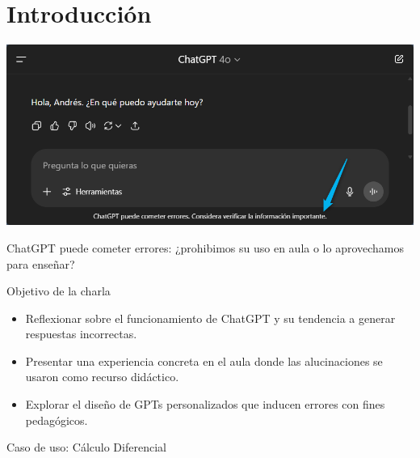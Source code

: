 \section{Introducción}

\begin{frame}
  
        \begin{center}
        \includegraphics[width=0.8\linewidth]{Figuras/Fig01.png}
        \end{center}
    \begin{block}{}\centering\large
        ChatGPT puede cometer errores: ¿prohibimos su uso en aula o lo aprovechamos para enseñar?
    \end{block}    
\end{frame}

\begin{frame}
    \begin{block}{Objetivo de la charla}
        \begin{itemize}[leftmargin=*]
            \item Reflexionar sobre el funcionamiento de ChatGPT y su tendencia a generar respuestas incorrectas.
            \item Presentar una experiencia concreta en el aula donde las alucinaciones se usaron como recurso didáctico.
            \item Explorar el diseño de GPTs personalizados que inducen errores con fines pedagógicos.
        \end{itemize}
    \end{block}

    \vspace{0.3cm}
    \pause
    \begin{block}{}\centering
        Caso de uso: Cálculo Diferencial
    \end{block}
\end{frame}



